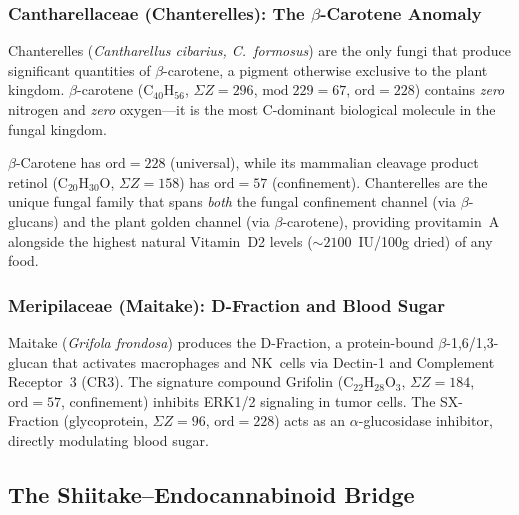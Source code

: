 \subsubsection{Cantharellaceae (Chanterelles): The $\beta$-Carotene Anomaly}

Chanterelles (\emph{Cantharellus cibarius, C.\ formosus}) are the only
fungi that produce significant quantities of $\beta$-carotene, a pigment
otherwise exclusive to the plant kingdom. $\beta$-carotene
($\mathrm{C}_{40}\mathrm{H}_{56}$, $\Sigma Z = 296$, $\mathrm{mod}\;229 = 67$,
$\mathrm{ord} = 228$) contains \emph{zero} nitrogen and \emph{zero} oxygen---it
is the most C-dominant biological molecule in the fungal kingdom.

\begin{result}
\label{res:carotene}
$\beta$-Carotene has $\mathrm{ord} = 228$ (universal), while its mammalian
cleavage product retinol ($\mathrm{C}_{20}\mathrm{H}_{30}\mathrm{O}$,
$\Sigma Z = 158$) has $\mathrm{ord} = 57$ (confinement). Chanterelles are
the unique fungal family that spans \emph{both} the fungal confinement channel
(via $\beta$-glucans) and the plant golden channel (via $\beta$-carotene),
providing provitamin~A alongside the highest natural Vitamin~D2 levels
($\sim\!2100$~IU/100g dried) of any food.
\end{result}

\subsubsection{Meripilaceae (Maitake): D-Fraction and Blood Sugar}

Maitake (\emph{Grifola frondosa}) produces the D-Fraction, a protein-bound
$\beta$-1,6/1,3-glucan that activates macrophages and NK~cells via Dectin-1
and Complement Receptor~3 (CR3). The signature compound Grifolin
($\mathrm{C}_{22}\mathrm{H}_{28}\mathrm{O}_3$, $\Sigma Z = 184$,
$\mathrm{ord} = 57$, confinement) inhibits ERK1/2 signaling in tumor cells.
The SX-Fraction (glycoprotein, $\Sigma Z = 96$, $\mathrm{ord} = 228$)
acts as an $\alpha$-glucosidase inhibitor, directly modulating blood sugar.

\subsection{The Shiitake--Endocannabinoid Bridge}

